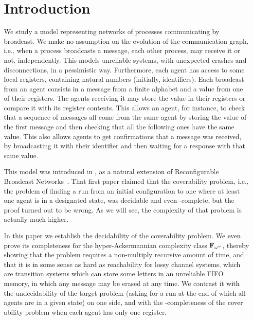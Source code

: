 \section{Introduction}

We study a model representing networks of processes communicating by broadcast. We make no assumption on the evolution of the communication graph, i.e., when a process broadcasts a message, each other process, may receive it or not, independently. This models unreliable systems, with unexpected crashes and disconnections, in a pessimistic way. 
Furthermore, each agent has access to some local registers, containing natural numbers (initially, identifiers). Each broadcast from an agent consists in a message from a finite alphabet and a value from one of their registers. The agents receiving it may store the value in their registers or compare it with its register contents. 
This allows an agent, for instance, to check that a sequence of messages all come from the same agent by storing the value of the first message and then checking that all the following ones have the same value.
This also allows agents to get confirmations that a message was received, by broadcasting it with their identifier and then waiting for a response with that same value.

This model was introduced in \cite{DST2013}, as a natural extension of Reconfigurable Broadcast Networks~\cite{DelzannoSZ2010Adhoc}. That first paper claimed that the coverability problem, i.e., the problem of finding a run from an initial configuration to one where at least one agent is in a designated state, was decidable and even \PSPACE-complete, but the proof turned out to be wrong. As we will see, the complexity of that problem is actually much higher.

In this paper we establish the decidability of the coverability problem. We even prove its completeness for the hyper-Ackermannian complexity class $\mathbf{F}_{\omega^\omega}$, thereby showing that the problem requires a non-multiply recursive amount of time, and that it is in some sense as hard as reachability for lossy channel systems, which are transition systems which can store some letters in an unreliable FIFO memory, in which any message may be erased at any time. 
We contrast it with the undecidability of the target problem (asking for a run at the end of which all agents are in a given state) on one side, and with the \NP-completeness of the cover ability problem when each agent has only one register. 

